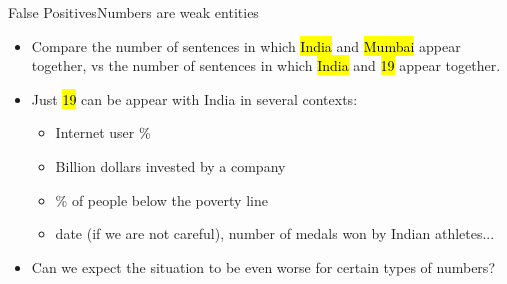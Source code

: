 \documentclass{beamer}
\makeatletter
\newcommand\SoulColor{%
  \let\set@color\beamerorig@set@color
  \let\reset@color\beamerorig@reset@color}
\makeatother
\begin{document}
 \begin{frame}{False Positives}{Numbers are weak entities}
 \begin{itemize}  
 \item Compare the number of sentences in which {\SoulColor\hl{India}} and {\SoulColor\hl{Mumbai}} appear together, vs the number of sentences
  in which {\SoulColor\hl{India}} and {\SoulColor\hl{19}} appear together.
 \item Just {\SoulColor\hl{19}} can be appear with India in several contexts:
 \begin{itemize}
 \item Internet user \%
 \item Billion dollars invested by a company
 \item \% of people below the poverty line
 \item date (if we are not careful), number of medals won by Indian athletes...
\end{itemize}

 \item Can we expect the situation to be even worse for certain types of numbers?
\end{itemize}
\end{frame}
\end{document}
